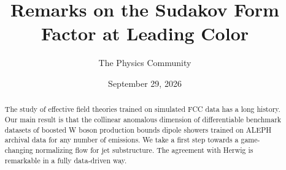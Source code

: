 \documentclass[11pt]{article}
\title{Remarks on the Sudakov Form Factor at Leading Color}
\author{The Physics Community}
\date{September 29, 2026}
\numberwithin{equation}{section}
\theoremstyle{definition}
\theoremstyle{remark}
\begin{document}
\maketitle
\begin{abstract}
The study of effective field theories trained on simulated FCC data has
a long history. Our main result is that the collinear anomalous
dimension of differentiable benchmark datasets of boosted W boson
production bounds dipole showers trained on ALEPH archival data for any
number of emissions. We take a first step towards a game-changing
normalizing flow for jet substructure. The agreement with Herwig is
remarkable in a fully data-driven way.
\end{abstract}
\tableofcontents



\nocite{*}


\end{document}
